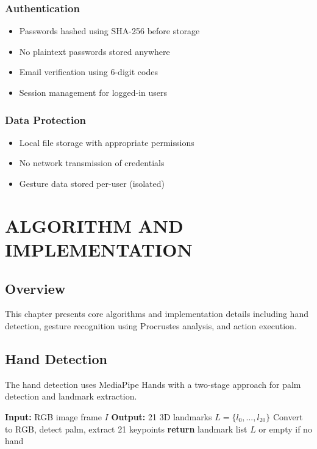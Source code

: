 \documentclass[12pt,a4paper]{report}
\begin{document}
\subsection{Authentication}
\begin{itemize}
    \item Passwords hashed using SHA-256 before storage
    \item No plaintext passwords stored anywhere
    \item Email verification using 6-digit codes
    \item Session management for logged-in users
\end{itemize}

\subsection{Data Protection}
\begin{itemize}
    \item Local file storage with appropriate permissions
    \item No network transmission of credentials
    \item Gesture data stored per-user (isolated)
\end{itemize}

\clearpage
\chapter{ALGORITHM AND IMPLEMENTATION}

\section{Overview}

This chapter presents core algorithms and implementation details including hand detection, gesture recognition using Procrustes analysis, and action execution.

\section{Hand Detection}

The hand detection uses MediaPipe Hands with a two-stage approach for palm detection and landmark extraction.

\begin{algorithm}[H]
\caption{Hand Detection and Landmark Extraction}
\begin{algorithmic}[1]
\STATE \textbf{Input:} RGB image frame $I$
\STATE \textbf{Output:} 21 3D landmarks $L = \{l_0, ..., l_{20}\}$
\STATE Convert to RGB, detect palm, extract 21 keypoints
\STATE \textbf{return} landmark list $L$ or empty if no hand
\end{algorithmic}
\end{algorithm}
\end{document}
